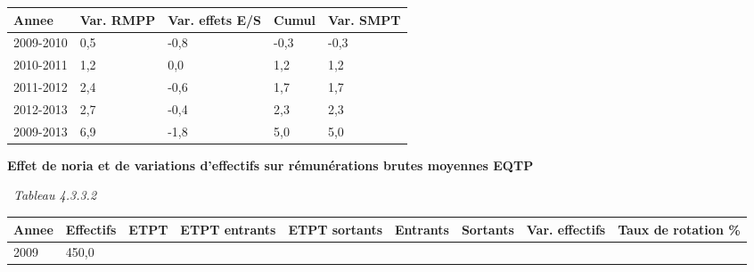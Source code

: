 \begin{longtable}[]{@{}lllll@{}}
\toprule
Annee & Var. RMPP & Var. effets E/S & Cumul & Var. SMPT\tabularnewline
\midrule
\endhead
2009-2010 & 0,5 & -0,8 & -0,3 & -0,3\tabularnewline
2010-2011 & 1,2 & 0,0 & 1,2 & 1,2\tabularnewline
2011-2012 & 2,4 & -0,6 & 1,7 & 1,7\tabularnewline
2012-2013 & 2,7 & -0,4 & 2,3 & 2,3\tabularnewline
2009-2013 & 6,9 & -1,8 & 5,0 & 5,0\tabularnewline
\bottomrule
\end{longtable}

\textbf{Effet de noria et de variations d'effectifs sur rémunérations
brutes moyennes EQTP}

~\emph{Tableau 4.3.3.2}

\begin{longtable}[]{@{}lllllllll@{}}
\toprule
\begin{minipage}[b]{0.05\columnwidth}\raggedright
Annee\strut
\end{minipage} & \begin{minipage}[b]{0.08\columnwidth}\raggedright
Effectifs\strut
\end{minipage} & \begin{minipage}[b]{0.05\columnwidth}\raggedright
ETPT\strut
\end{minipage} & \begin{minipage}[b]{0.10\columnwidth}\raggedright
ETPT entrants\strut
\end{minipage} & \begin{minipage}[b]{0.10\columnwidth}\raggedright
ETPT sortants\strut
\end{minipage} & \begin{minipage}[b]{0.07\columnwidth}\raggedright
Entrants\strut
\end{minipage} & \begin{minipage}[b]{0.07\columnwidth}\raggedright
Sortants\strut
\end{minipage} & \begin{minipage}[b]{0.11\columnwidth}\raggedright
Var. effectifs\strut
\end{minipage} & \begin{minipage}[b]{0.14\columnwidth}\raggedright
Taux de rotation \%\strut
\end{minipage}\tabularnewline
\midrule
\endhead
\begin{minipage}[t]{0.05\columnwidth}\raggedright
2009\strut
\end{minipage} & \begin{minipage}[t]{0.08\columnwidth}\raggedright
450,0\strut
\end{minipage} & \begin{minipage}[t]{0.05\columnwidth}\raggedright

\end{minipage}
\end{longtable}

